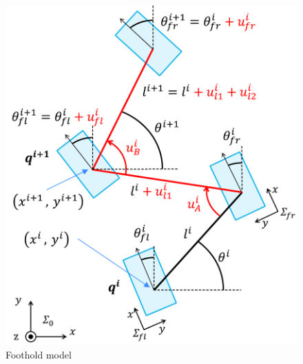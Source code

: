 \documentclass[autodetect-engine,dvipdfmx-if-dvi,ja=standard,a4j,jbase=11pt,magstyle=nomag*]{bxjsreport}
\begin{document}
\begin{figure}[pt]
    \centering
    \includegraphics[width=0.9\linewidth, clip]{./figure/model_footstep.pdf}
    \caption{Foothold model}
    \label{fig:foothold_model}
\end{figure}
\end{document}
